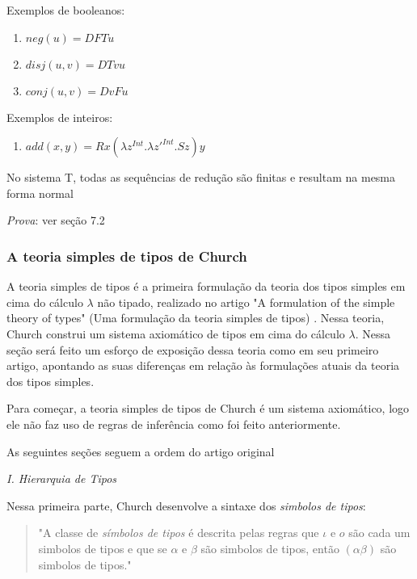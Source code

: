 \documentclass[../main.tex]{subfiles}
\begin{document}
Exemplos de booleanos:

\begin{enumerate}
    \item $neg(u) = DFTu$
    \item $disj(u, v) = DTvu$
    \item $conj(u, v) = DvFu$
\end{enumerate}

Exemplos de inteiros:

\begin{enumerate}
    \item $add(x, y) = Rx(\lambda z^{Int} . \lambda z'^{Int} . Sz)y$
\end{enumerate}


\begin{theorem}
    No sistema T, todas as sequências de redução são finitas e resultam na mesma forma normal
\end{theorem}

\emph{Prova}: ver \cite{girard1989} seção 7.2


\subsubsection{A teoria simples de tipos de Church}

A teoria simples de tipos é a primeira formulação da teoria dos tipos simples em cima do cálculo $\lambda$ não tipado, realizado no artigo "A formulation of the simple theory of types" (Uma formulação da teoria simples de tipos) \cite{church1940}. Nessa teoria, Church construi um sistema axiomático de tipos em cima do cálculo $\lambda$. Nessa seção será feito um esforço de exposição dessa teoria como em seu primeiro artigo, apontando as suas diferenças em relação às formulações atuais da teoria dos tipos simples.

Para começar, a teoria simples de tipos de Church é um sistema axiomático, logo ele não faz uso de regras de inferência como foi feito anteriormente. 

As seguintes seções seguem a ordem do artigo original

\emph{I. Hierarquia de Tipos}

Nessa primeira parte, Church desenvolve a sintaxe dos \emph{simbolos de tipos}:

\begin{quote}
    "A classe de \emph{símbolos de tipos} é descrita pelas regras que $\iota$ e $o$ são cada um simbolos de tipos e que se $\alpha$ e $\beta$ são simbolos de tipos, então $(\alpha\beta)$ são simbolos de tipos." \cite[p. 56]{church1940}
\end{quote}
\end{document}
